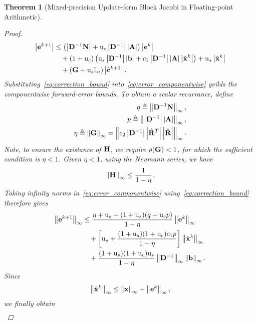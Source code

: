 \documentclass[11pt,draft]{article}
\newcommand{\urd}{\ensuremath{\mathrm{u}}}
\newcommand{\define}{\ensuremath{\triangleq}}
\newcommand{\vect}[1]{\mathbf{\MakeLowercase{#1}}}
\newcommand{\mat}[1]{\mathbf{\MakeUppercase{#1}}}
\newcommand{\norm}[2][]{\left\|#2\right\|_{#1}}
\newtheorem{theorem}{Theorem}[section]
\theoremstyle{definition}
\theoremstyle{remark}
\newcommand{\abs}[1]{\left|#1\right|}
\begin{document}
\begin{theorem}[Mixed-precision Update-form Block Jacobi in Floating-point Arithmetic]
\begin{proof}
\begin{align}
    \abs{\vect{e}^{k+1}}
    &\leq
    \left(
        \abs{\mat{d}^{-1}\mat{n}}
        +\urd_c\abs{\mat{d}^{-1}}\abs{\mat{a}}
    \right)\abs{\vect{e}^k}
    \nonumber\\
    &\quad
    +(1+\urd_c)
    \left(
        \urd_s\abs{\mat{d}^{-1}}\abs{\vect{b}}
        +c_1\abs{\mat{d}^{-1}}\abs{\mat{a}}
         \abs{\hat{\vect{x}}^k}
    \right)
    +\urd_s\abs{\hat{\vect{x}}^k}
    \nonumber\\
    &\quad
    +(\mat{g}+\urd_s\mathbb{I}_n)
      \abs{\hat{\vect{c}}^{k+1}}.
    \label{eq:error_componentwise}
\end{align}
Substituting~\cref{eq:correction_bound} into~\cref{eq:error_componentwise} yeilds the componentwise forward-error bounds.
To obtain a scalar recurrance, define
\begin{align}
    q \define \norm[\infty]{\mat{d}^{-1}\mat{n}},\\
    p \define \norm[\infty]{\abs{\mat{d}^{-1}}\abs{\mat{a}}},\\
    \eta \define \norm[\infty]{\mat{g}} = \norm[\infty]{c_2\abs{\mat{d}^{-1}}\abs{\hat{\mat{r}}^T}\abs{\hat{\mat{r}}}}.
\end{align}
Note, to ensure the existance of $\mat{h}$, we require $\rho(\mat{g}) < 1$, for which the sufficient condition is $\eta < 1$.
Given $\eta < 1$, using the Neumann series, we have 
\begin{align}
\norm[\infty]{\mat{h}} \leq \frac{1}{1 - \eta}.
\end{align}
Taking infinity norms in~\cref{eq:error_componentwise} using~\cref{eq:correction_bound} therefore gives
\begin{align}
    \norm[\infty]{\vect{e}^{k+1}}
    &\leq
    \frac{
        \eta+\urd_s
        +(1+\urd_s)(q+\urd_c p)
    }{1-\eta}
    \norm[\infty]{\vect{e}^k}
    \nonumber\\
    &\quad
    +\left[
        \urd_s
        +
        \frac{(1+\urd_s)(1+\urd_c)c_1p}
             {1-\eta}
    \right]
    \norm[\infty]{\hat{\vect{x}}^k}
    \nonumber\\
    &\quad
    +
    \frac{
        (1+\urd_s)(1+\urd_c)\urd_s
    }{1-\eta}
    \norm[\infty]{\mat{d}^{-1}}
    \norm[\infty]{\vect{b}}.
    \label{eq:error_before_xbound}
\end{align}
Since 
\begin{align}
    \norm[\infty]{\hat{\vect{x}}^k} \leq \norm[\infty]{\vect{x}} +\norm[\infty]{\vect{e}^k},
\end{align}
we finally obtain
\begin{align}

\end{align}
\end{proof}
\end{theorem}
\end{document}
